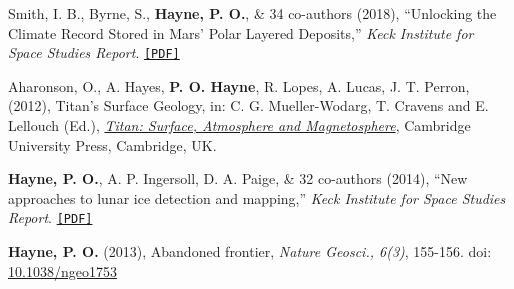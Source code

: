 \documentclass[letterpaper,10pt,twoside]{article}
\begin{document}
\noindent {\large\textcolor{darkgray}{Publications: Book Chapters \& Reports}}

\vspace{0.05in}
\begin{enumerate}
    {\small
    \item Smith, I. B., Byrne, S., {\bf Hayne, P. O.}, \& 34 co-authors (2018), ``Unlocking the Climate Record Stored in Mars' Polar Layered Deposits,'' {\it Keck Institute for Space Studies Report}.  \href{http://kiss.caltech.edu/final_reports/Polar_Final_Report.pdf}{\tt [PDF]}
    
    \item Aharonson, O., A. Hayes, {\bf P. O. Hayne}, R. Lopes, A. Lucas, J. T. Perron, (2012), Titan's Surface Geology, in: C. G. Mueller-Wodarg, T. Cravens and E. Lellouch (Ed.), {\it \href{http://www.cambridge.org/us/academic/subjects/physics/computational-science-and-modelling/titan-interior-surface-atmosphere-and-space-environment?format=HB#KJpk8zYpjXmsJDf4.97}{Titan: Surface, Atmosphere and Magnetosphere}}, Cambridge University Press, Cambridge, UK.
    
    \item {\bf Hayne, P. O.}, A. P. Ingersoll, D. A. Paige, \& 32 co-authors (2014), ``New approaches to lunar ice detection and mapping,'' {\it Keck Institute for Space Studies Report}.  \href{http://kiss.caltech.edu/study/lunar-ice/KISS_lunar_report.pdf}{\tt [PDF]}
    }
\end{enumerate}

\vspace{0.05in}

\noindent {\large\textcolor{darkgray}{Publications: Commentaries}}

\vspace{0.05in}
\begin{enumerate}
    {\small
    \item {\bf Hayne, P. O.} (2013), Abandoned frontier, {\it Nature Geosci., 6(3)}, 155-156. doi: \href{https://doi.org/10.1038/ngeo1753}{10.1038/ngeo1753}
    }
\end{enumerate}

\vspace{0.05in}


    
\end{document}
